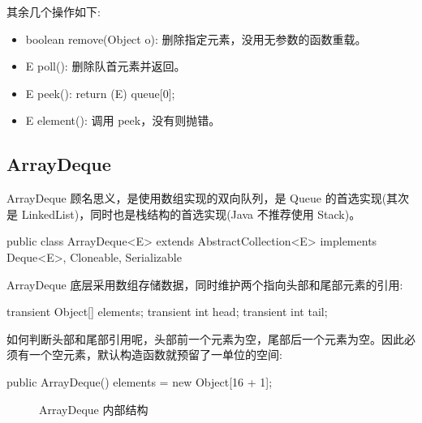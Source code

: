 其余几个操作如下:
\begin{itemize}
    \item boolean remove(Object o): 删除指定元素，没用无参数的函数重载。
    \item E poll(): 删除队首元素并返回。
    \item E peek(): return (E) queue[0];
    \item E element(): 调用 peek，没有则抛错。
\end{itemize}

\subsection{ArrayDeque}

ArrayDeque 顾名思义，是使用数组实现的双向队列，是 Queue 的首选实现(其次是 LinkedList)，同时也是栈结构的首选实现(Java 不推荐使用 Stack)。

\begin{Java}
public class ArrayDeque<E> extends AbstractCollection<E> implements Deque<E>, Cloneable, Serializable
\end{Java}

ArrayDeque 底层采用数组存储数据，同时维护两个指向头部和尾部元素的引用:

\begin{Java}
transient Object[] elements;
transient int head;
transient int tail;
\end{Java}

如何判断头部和尾部引用呢，头部前一个元素为空，尾部后一个元素为空。因此必须有一个空元素，默认构造函数就预留了一单位的空间:

\begin{Java}
public ArrayDeque() {
    elements = new Object[16 + 1];
}
\end{Java}

\begin{figure}[H]
    \centering
    \caption{ArrayDeque 内部结构}
    \label{fig:ArrayDeque 内部结构}
\end{figure}

